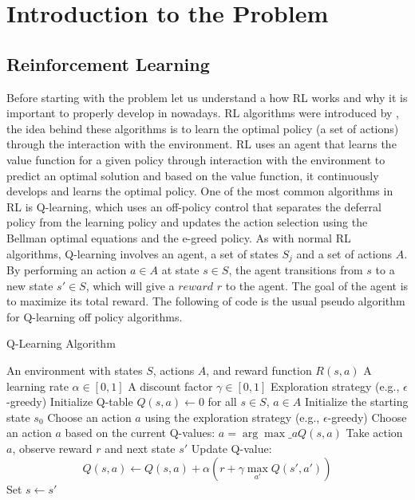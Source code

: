 
\chapter{Introduction to the Problem}
\label{cha:problem}

\section{Reinforcement Learning}

Before starting with the problem let us understand a how \ac{RL} works and why it is  
important to properly develop in nowadays.
\ac{RL} algorithms were introduced by \citet{Sutton1998}, the idea behind these 
algorithms is to learn the optimal policy (a set of actions) through the interaction 
with the environment. \ac{RL} uses an agent that learns the value function for a given policy 
through interaction with the environment to predict an optimal solution and based on the value 
function, it continuously develops and learns the optimal policy. One of the most common algorithms
in \ac{RL} is Q-learning\cite{8836506}, which uses an off-policy control that separates the deferral 
policy from the learning policy and updates the action selection using the Bellman optimal equations
and the e-greed policy. As with normal \ac{RL} algorithms, Q-learning involves an agent, a set of states
$S_j$ and a set of actions $A$. By performing an action $a\in A$ at state $s \in S$, the agent 
transitions from $s$ to a new state $s' \in S$, which will give a $reward$ $r$ to the agent. 
The goal of the agent is to maximize its 
total reward. The following  
of code is the usual pseudo algorithm for 
Q-learning off policy algorithms\cite{Sutton1998}.

\begin{algorithm}
\caption{Q-Learning Algorithm}\label{lst:qlearning}
\begin{algorithmic}
\Require An environment with states $S$, actions $A$, and reward function $R(s, a)$
\Require A learning rate $\alpha \in [0, 1]$
\Require A discount factor $\gamma \in [0, 1]$
\Require Exploration strategy (e.g., $\epsilon$-greedy)
\State Initialize Q-table $Q(s, a) \gets 0$ for all $s \in S$, $a \in A$
    \State Initialize the starting state $s_0$
            \State Choose an action $a$ using the exploration strategy (e.g., $\epsilon$-greedy)
        \Else
            \State Choose an action $a$ based on the current Q-values: $a = \arg\max\_a Q(s, a)$
        \EndIf
        \State Take action $a$, observe reward $r$ and next state $s'$
        \State Update Q-value: 
        \[
        Q(s, a) \gets Q(s, a) + \alpha \left( r + \gamma \max_{a'} Q(s', a')\right)
        \]
        \State Set $s \gets s'$
    \EndFor
\EndFor
\end{algorithmic}
\end{algorithm}

